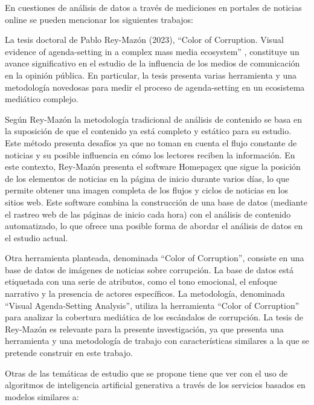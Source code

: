 \documentclass[12pt]{article}
\begin{document}
En cuestiones de análisis de datos a través de mediciones en portales de noticias online se pueden mencionar los siguientes trabajos:

La tesis doctoral de Pablo Rey-Mazón (2023), ``Color of Corruption. Visual evidence of agenda-setting in a complex mass media ecosystem'' \cite{mazon:2023}, constituye un avance significativo en el estudio de la influencia de los medios de comunicación en la opinión pública. En particular, la tesis presenta varias herramienta y una metodología novedosas para medir el proceso de agenda-setting en un ecosistema mediático complejo.

Según Rey-Mazón la metodología tradicional de análisis de contenido se basa en la suposición de que el contenido ya está completo y estático para su estudio. Este método presenta desafíos ya que no toman en cuenta el flujo constante de noticias y su posible influencia en cómo los lectores reciben la información. En este contexto, Rey-Mazón presenta el software Homepagex que sigue la posición de los elementos de noticias en la página de inicio durante varios días, lo que permite obtener una imagen completa de los flujos y ciclos de noticias en los sitios web. Este software combina la construcción de una base de datos (mediante el rastreo web de las páginas de inicio cada hora) con el análisis de contenido automatizado, lo que ofrece una posible forma de abordar el análisis de datos en el estudio actual.

Otra herramienta planteada, denominada ``Color of Corruption'', consiste en una base de datos de imágenes de noticias sobre corrupción. La base de datos está etiquetada con una serie de atributos, como el tono emocional, el enfoque narrativo y la presencia de actores específicos. La metodología, denominada ``Visual Agenda-Setting Analysis'', utiliza la herramienta ``Color of Corruption'' para analizar la cobertura mediática de los escándalos de corrupción. La tesis de Rey-Mazón es relevante para la presente investigación, ya que presenta una herramienta y una metodología de trabajo con características similares a la que se pretende construir en este trabajo. 



Otras de las temáticas de estudio que se propone tiene que ver con el uso de algoritmos de inteligencia artificial generativa a través de los servicios basados en modelos similares a:  
\end{document}
